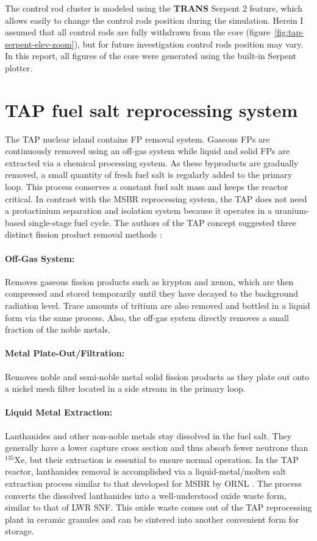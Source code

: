 The control rod cluster is modeled using the \textbf{TRANS} Serpent 2 feature, 
which allows easily to change the control rods position during the simulation. 
Herein I assumed that all control rods are fully withdrawn from the core 
(figure~\ref{fig:tap-serpent-elev-zoom}), but for future investigation control 
rods position may vary. In this report, all figures of the core were 
generated using the built-in Serpent plotter.

\section{TAP fuel salt reprocessing system}
The \gls{TAP} nuclear island contains \gls{FP} removal system. Gaseous  
\glspl{FP} are continuously removed using an off-gas system while liquid and 
solid \glspl{FP} are extracted via a chemical processing system. As these 
byproducts are gradually removed, a small quantity of fresh fuel salt is 
regularly added to the primary loop. This process conserves a constant fuel 
salt mass and keeps the reactor critical. In contrast with the \gls{MSBR} 
reprocessing system, the \gls{TAP} does not need a protactinium separation and 
isolation system because it operates in a uranium-based single-stage fuel 
cycle. The authors of the \gls{TAP} concept suggested three distinct fission 
product removal methods \cite{transatomic_power_corporation_neutronics_2016}:
\paragraph{Off-Gas System:} Removes gaseous fission products such as krypton 
and xenon, which are then compressed and stored temporarily until they have 
decayed to the background radiation level. Trace amounts of tritium are also 
removed and bottled in a liquid form via the same process. Also, the off-gas 
system directly removes a small fraction of the noble metals.
\paragraph{Metal Plate-Out/Filtration:} Removes noble and semi-noble metal 
solid fission products as they plate out onto a nickel mesh filter located in 
a side stream in the primary loop.
\paragraph{Liquid Metal Extraction:} Lanthanides and other non-noble metals 
stay dissolved in the fuel salt. They generally have a lower capture cross 
section and thus absorb fewer neutrons than $^{135}$Xe, but their extraction 
is essential to ensure normal operation. In the \gls{TAP} reactor, lanthanides 
removal is accomplished via a liquid-metal/molten salt extraction process 
similar to that developed for \gls{MSBR} by \gls{ORNL}  
\cite{robertson_conceptual_1971}. The process converts the dissolved 
lanthanides into a well-understood oxide waste form, similar to that of 
\gls{LWR} \gls{SNF}. This oxide waste comes out of the \gls{TAP} reprocessing 
plant in ceramic granules and can be sintered into another convenient form for 
storage.

